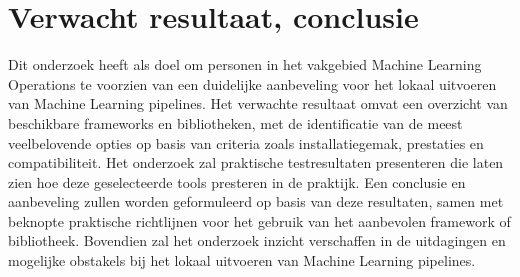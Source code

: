 


\section{Verwacht resultaat, conclusie}%
\label{sec:verwachte_resultaten}
Dit onderzoek heeft als doel om personen in het vakgebied Machine Learning Operations te voorzien van een duidelijke aanbeveling voor het lokaal uitvoeren van Machine Learning pipelines. Het verwachte resultaat omvat een overzicht van beschikbare frameworks en bibliotheken, met de identificatie van de meest veelbelovende opties op basis van criteria zoals installatiegemak, prestaties en compatibiliteit. Het onderzoek zal praktische testresultaten presenteren die laten zien hoe deze geselecteerde tools presteren in de praktijk. Een conclusie en aanbeveling zullen worden geformuleerd op basis van deze resultaten, samen met beknopte praktische richtlijnen voor het gebruik van het aanbevolen framework of bibliotheek. Bovendien zal het onderzoek inzicht verschaffen in de uitdagingen en mogelijke obstakels bij het lokaal uitvoeren van Machine Learning pipelines.



